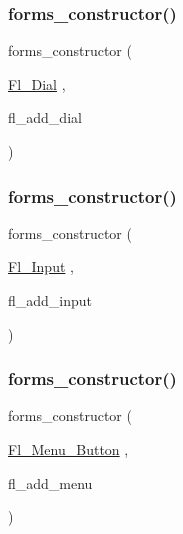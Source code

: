 \mbox{\label{forms_8_h_a110fe4cb82fb9d8ae5cbc29bc6a49868}} 
\subsubsection{\texorpdfstring{forms\+\_\+constructor()}{forms\_constructor()}\hspace{0.1cm}{\footnotesize\ttfamily [6/10]}}
{\footnotesize\ttfamily forms\+\_\+constructor (\begin{DoxyParamCaption}\item[{\hyperlink{class_fl___dial}{Fl\+\_\+\+Dial}}]{,  }\item[{fl\+\_\+add\+\_\+dial}]{ }\end{DoxyParamCaption})}

\mbox{\label{forms_8_h_ad55c5b5069b077211135a0ddbbd7a3cd}} 
\subsubsection{\texorpdfstring{forms\+\_\+constructor()}{forms\_constructor()}\hspace{0.1cm}{\footnotesize\ttfamily [7/10]}}
{\footnotesize\ttfamily forms\+\_\+constructor (\begin{DoxyParamCaption}\item[{\hyperlink{class_fl___input}{Fl\+\_\+\+Input}}]{,  }\item[{fl\+\_\+add\+\_\+input}]{ }\end{DoxyParamCaption})}

\mbox{\label{forms_8_h_a76d5114240241be535b29487aa3de661}} 
\subsubsection{\texorpdfstring{forms\+\_\+constructor()}{forms\_constructor()}\hspace{0.1cm}{\footnotesize\ttfamily [8/10]}}
{\footnotesize\ttfamily forms\+\_\+constructor (\begin{DoxyParamCaption}\item[{\hyperlink{class_fl___menu___button}{Fl\+\_\+\+Menu\+\_\+\+Button}}]{,  }\item[{fl\+\_\+add\+\_\+menu}]{ }\end{DoxyParamCaption})}

